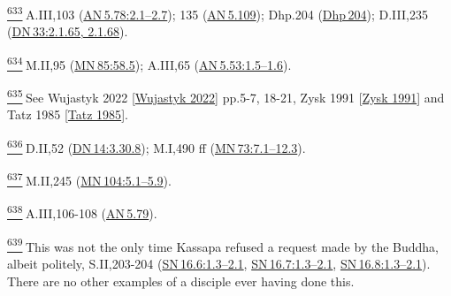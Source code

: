 \label{footprints_split_025.html_fn633}
\hyperref[footprints_split_015.htmlux5cux23fnref633]{\textsuperscript{633}} A.III,103
(\href{https://suttacentral.net/an5.78/en/sujato\#2.1}{AN\,5.78:2.1--2.7});
135 (\href{https://suttacentral.net/an5.109/en/sujato}{AN\,5.109});
Dhp.204 (\href{https://suttacentral.net/dhp204/en/sujato}{Dhp\,204});
D.III,235
(\href{https://suttacentral.net/dn33/en/sujato\#2.1.65}{DN\,33:2.1.65,
2.1.68}).

\label{footprints_split_025.html_fn634}
\hyperref[footprints_split_015.htmlux5cux23fnref634]{\textsuperscript{634}} M.II,95
(\href{https://suttacentral.net/mn85/en/sujato\#58.5}{MN\,85:58.5});
A.III,65
(\href{https://suttacentral.net/an5.53/en/sujato\#1.5}{AN\,5.53:1.5--1.6}).

\label{footprints_split_025.html_fn635}
\hyperref[footprints_split_015.htmlux5cux23fnref635]{\textsuperscript{635}} See
{Wujastyk 2022
{{[}\hyperref[footprints_split_022.htmlux5cux23Wujastykux5cux25202022]{Wujastyk
2022}{]}}} pp.5-7, 18-21, {Zysk 1991
{{[}\hyperref[footprints_split_022.htmlux5cux23Zyskux5cux25201991]{Zysk
1991}{]}}} and {Tatz 1985
{{[}\hyperref[footprints_split_022.htmlux5cux23Tatzux5cux25201985]{Tatz
1985}{]}}}.

\label{footprints_split_025.html_fn636}
\hyperref[footprints_split_016.htmlux5cux23fnref636]{\textsuperscript{636}} D.II,52
(\href{https://suttacentral.net/dn14/en/sujato\#3.30.8}{DN\,14:3.30.8});
M.I,490 ff
(\href{https://suttacentral.net/mn73/en/sujato\#7.1}{MN\,73:7.1--12.3}).

\label{footprints_split_025.html_fn637}
\hyperref[footprints_split_016.htmlux5cux23fnref637]{\textsuperscript{637}} M.II,245
(\href{https://suttacentral.net/mn104/en/sujato\#5.1}{MN\,104:5.1--5.9}).

\label{footprints_split_025.html_fn638}
\hyperref[footprints_split_016.htmlux5cux23fnref638]{\textsuperscript{638}} A.III,106-108
(\href{https://suttacentral.net/an5.79/en/sujato}{AN\,5.79}).

\label{footprints_split_025.html_fn639}
\hyperref[footprints_split_016.htmlux5cux23fnref639]{\textsuperscript{639}} This
was not the only time Kassapa refused a request made by the Buddha,
albeit politely, S.II,203-204
(\href{https://suttacentral.net/sn16.6/en/sujato\#1.3}{SN\,16.6:1.3--2.1},
\href{https://suttacentral.net/sn16.7/en/sujato\#1.3}{SN\,16.7:1.3--2.1},
\href{https://suttacentral.net/sn16.8/en/sujato\#1.3}{SN\,16.8:1.3--2.1}).
There are no other examples of a disciple ever having done this.

